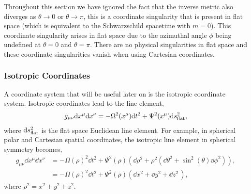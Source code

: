 Throughout this section we have ignored the fact that the inverse metric also diverges as $\theta\rightarrow 0$ or $\theta \rightarrow \pi$, this is a coordinate singularity that is present in flat space (which is equivalent to the Schwarzschild spacetime with $m=0$). This coordinate singularity arises in flat space due to the azimuthal angle $\phi$ being undefined at $\theta=0$ and $\theta=\pi$. There are no physical singularities in flat space and these coordinate singularities vanish when using Cartesian coordinates.




\subsubsection{Isotropic Coordinates}
A coordinate system that will be useful later on is the isotropic coordinate system. Isotropic coordinates lead to the line element,
\begin{align}
g_{\mu\nu} \dd x^\mu \dd x^\nu = -\Omega^2(x^\mu) \dd t^2 + \Psi^2(x^\mu) \dd s^2_{\rm flat},
\end{align}
where $\dd s^2_{\rm flat}$ is the flat space Euclidean line element. For example, in spherical polar and Cartesian spatial coordinates, the isotropic line element in spherical symmetry becomes,
\begin{align}
g_{\mu\nu} \dd x^\mu \dd x^\nu &= -\Omega(\rho)^2 \dd t^2 + \Psi^2(\rho) \left( \dd \rho^2 + \rho^2 \left( \dd \theta^2 + \sin^2(\theta) \dd \phi^2 \right)\right) ,\\
 &= -\Omega(\rho)^2 \dd t^2 + \Psi^2(\rho) \left( {\dd x^2 + \dd y^2 + \dd z^2 }\,\right),
\end{align}
where $\rho^2 = x^2 + y^2 + z^2$.

